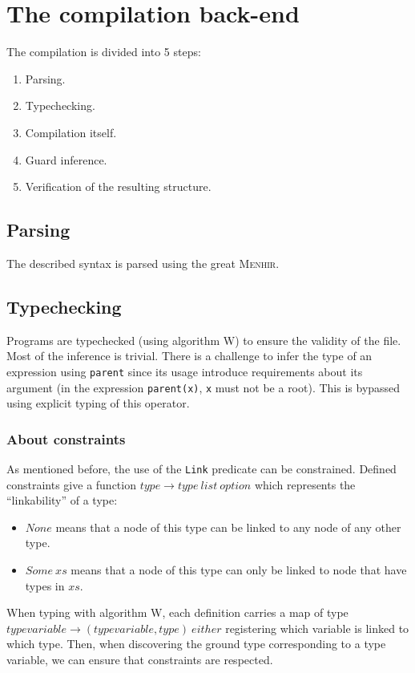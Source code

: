 \documentclass[10pt,a4paper]{article}
\newcommand\Menhir{\textsc{Menhir}}
\newcommand{\ocaml}{\texttt}
\begin{document}
\section{The compilation back-end}
The compilation is divided into 5 steps:
\begin{enumerate}
\item Parsing.
\item Typechecking.
\item Compilation itself.
\item Guard inference.
\item Verification of the resulting structure.
\end{enumerate}

\subsection{Parsing}
The described syntax is parsed using the great \Menhir{}\cite{menhir}.

\subsection{Typechecking}
Programs are typechecked (using algorithm W) to ensure the validity of the file. Most of the inference is trivial. There is a challenge to infer the type of an expression using \ocaml{parent} since its usage introduce requirements about its argument (in the expression \ocaml{parent(x)}, \ocaml{x} must not be a root). This is bypassed using explicit typing of this operator.\\

\subsubsection{About constraints}
As mentioned before, the use of the \ocaml{Link} predicate can be constrained. Defined constraints give a function $type \to type\ list\ option$ which represents the ``linkability'' of a type:
\begin{itemize}
\item $None$ means that a node of this type can be linked to any node of any other type.
\item $Some\ xs$ means that a node of this type can only be linked to node that have types in $xs$.
\end{itemize}
When typing with algorithm W, each definition carries a map of type $typevariable \to (typevariable, type)\ either$ registering which variable is linked to which type. Then, when discovering the ground type corresponding to a type variable, we can ensure that constraints are respected.
\end{document}
